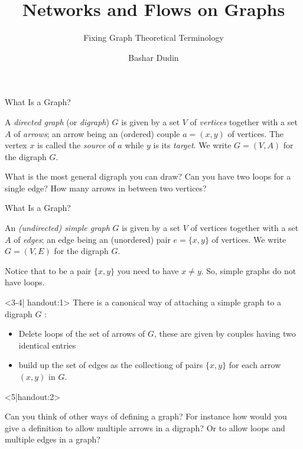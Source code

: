 \documentclass[32pt,aspectratio=169]{beamer}
\author[BD]{Bashar Dudin}
\institute[]{EPITA}
\title{Networks and Flows on Graphs} %
\subtitle{Fixing Graph Theoretical Terminology}
\begin{document}
\begin{frame}[plain]
\titlepage %
\end{frame}

\begin{frame}{What Is a Graph?}
  \begin{defn}
    A \emph{directed graph} (or \emph{digraph}) $G$ is given by a set $V$ of
    \emph{vertices} together with a set $A$ of \emph{arrows}; an arrow being an
    (ordered) couple $a = (x,y)$ of vertices. The vertex $x$ is called
    the \emph{source} of $a$ while $y$ is its \emph{target}. We write $G = (V, A)$
    for the digraph $G$.
  \end{defn}
  \pause
  \begin{question}
    What is the most general digraph you can draw? Can you have two
    loops for a single edge? How many arrows in between two vertices?
  \end{question}
\end{frame}

\begin{frame}{What Is a Graph?}
  \begin{defn}
    An \emph{(undirected) simple graph} $G$ is given by a set $V$ of vertices
    together with a set $A$ of \emph{edges}; an edge being an (unordered)
    pair $e = \{x,y\}$ of vertices. We write $G = (V, E)$ for the
    digraph $G$.
  \end{defn}
  \pause
  \begin{rem}
    Notice that to be a \alert{pair} $\{x, y\}$ you need to have
    $x \neq y$. So, simple graphs do not have loops.
  \end{rem}

  \begin{overlayarea}{\textwidth}{.35\textheight}
    \begin{onlyenv}<3-4| handout:1>
      There is a canonical way of attaching a simple graph to a digraph
      $G$ :
      \begin{itemize}
      \item<3-> Delete loops of the set of arrows of $G$, these are given by
        couples having two identical entries
      \item<4-> build up the set of edges as the collectiong of pairs
        $\{x, y\}$ for each arrow $(x, y)$ in $G$.
      \end{itemize}
    \end{onlyenv}
    \begin{onlyenv}<5|handout:2>
      \begin{question}
        Can you think of other ways of defining a graph? For instance how
        would you give a definition to allow multiple arrows in a digraph?
        Or to allow loops and multiple edges in a graph?
      \end{question}
    \end{onlyenv}
  \end{overlayarea}
\end{frame}
\end{document}
